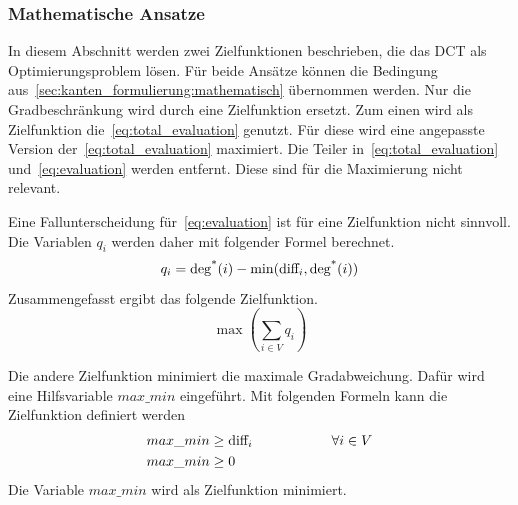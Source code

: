 \subsubsection{Mathematische Ansatze}
\label{sec:OR-Tools_mit_Durchschnitts_Abweichung}
In diesem Abschnitt werden zwei Zielfunktionen beschrieben, die das DCT als Optimierungsproblem lösen.
Für beide Ansätze können die Bedingung aus~\cref{sec:kanten_formulierung:mathematisch} übernommen werden.
Nur die Gradbeschränkung wird durch eine Zielfunktion ersetzt.
Zum einen wird als Zielfunktion die~\cref{eq:total_evaluation} genutzt.
Für diese wird eine angepasste Version der~\cref{eq:total_evaluation} maximiert.
Die Teiler in~\eqref{eq:total_evaluation} und~\eqref{eq:evaluation} werden entfernt. 
Diese sind für die Maximierung nicht relevant.

Eine Fallunterscheidung für~\eqref{eq:evaluation} ist für eine Zielfunktion nicht sinnvoll.
Die Variablen \(q_i\) werden daher mit folgender Formel berechnet.
\[
q_i = \operatorname{deg^*}(i) - \min(\text{diff}_i, \operatorname{deg^*}(i))
\]
Zusammengefasst ergibt das folgende Zielfunktion.
\[
\max\left(\sum_{i \in V} q_i\right)
\]

Die andere Zielfunktion minimiert die maximale Gradabweichung.
Dafür wird eine Hilfsvariable \(max\_min\) eingeführt.
Mit folgenden Formeln kann die Zielfunktion definiert werden
\begin{align*}
	max\_min &\geq \text{diff}_i \hspace{2cm} \forall i \in V \\
	max\_min &\geq 0
\end{align*}
Die Variable \(max\_min\) wird als Zielfunktion minimiert.

